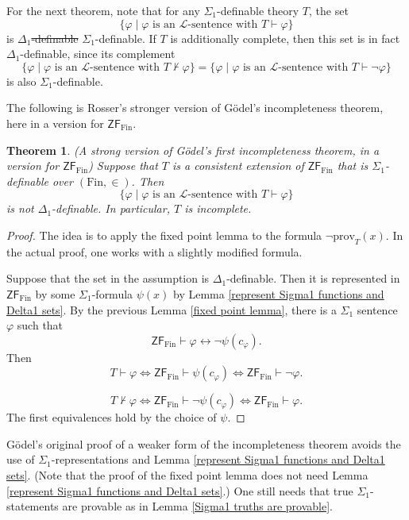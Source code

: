 \documentclass[a4paper, 11pt]{amsart}
\newtheorem{theorem}{Theorem}[subsection]
\theoremstyle{remark}
\newcommand{\axiomft}[1]{\mathsf{#1}}
\newcommand{\ZF}{\axiomft{ZF}}
\newcommand{\Fin}{\mathrm{Fin}}
\newcommand{\prov}{\mathrm{prov}}
\newcommand{\cL}{\mathcal L}
\begin{document}
For the next theorem, note that for any $\Sigma_1$-definable theory $T$, the set 
$$ \{ \varphi \mid  \varphi \text{ is an $\cL$-sentence with } T\vdash \varphi \} $$ 
is \sout{$\Delta_1$-definable} {\color{blue}$\Sigma_1$-definable}. 
{\color{blue} If $T$ is additionally complete, then this set is in fact $\Delta_1$-definable, since its complement 
$$ \{ \varphi \mid  \varphi \text{ is an $\cL$-sentence with } T\not\vdash \varphi \} =  \{ \varphi \mid  \varphi \text{ is an $\cL$-sentence with } T\vdash \neg\varphi \} $$ 
is also $\Sigma_1$-definable}. 


The following is Rosser's stronger version of G\"odel's incompleteness theorem, here in a version for $\ZF_\Fin$. 

\begin{theorem} 
\label{Goedel Rosser incompleteness theorem} 
(A strong version of G\"odel's first incompleteness theorem, in a version for $\ZF_\Fin$) 
Suppose that $T$ is a consistent extension of $\ZF_\Fin$ that is $\Sigma_1$-definable over $(\Fin,\in)$. 
Then 
$$ \{ \varphi \mid  \varphi \text{ is an $\cL$-sentence with } T\vdash \varphi \} $$ 
is not $\Delta_1$-definable. 
In particular, $T$ is incomplete. 
\end{theorem} 
\begin{proof} 
The idea is to apply the fixed point lemma to the formula $\neg\prov_T(x)$. 
In the actual proof, one works with a slightly modified formula. 

Suppose that the set in the assumption is $\Delta_1$-definable. 
Then it is represented in $\ZF_\Fin$ by some $\Sigma_1$-formula $\psi(x)$ by Lemma \ref{represent Sigma1 functions and Delta1 sets}. 
By the previous Lemma \ref{fixed point lemma}, there is a {\color{blue}\sout{$\Sigma_1$}} sentence $\varphi$ such that 
$$ \ZF_\Fin \vdash  \varphi\longleftrightarrow   \neg \psi(c_\varphi). $$ 
Then 
$$ T\vdash \varphi   \Longleftrightarrow   \ZF_\Fin  \vdash \psi(c_\varphi)   \Longleftrightarrow  \ZF_\Fin \vdash \neg \varphi. $$ 

$$ T\not\vdash \varphi   \Longleftrightarrow   \ZF_\Fin  \vdash \neg \psi(c_\varphi)   \Longleftrightarrow  \ZF_\Fin \vdash \varphi. $$ 
The first equivalences hold by the choice of $\psi$. 
\end{proof} 


G\"odel's original proof of a weaker form of the incompleteness theorem avoids the use of $\Sigma_1$-representations and Lemma \ref{represent Sigma1 functions and Delta1 sets}. 
(Note that the proof of the fixed point lemma does not need Lemma \ref{represent Sigma1 functions and Delta1 sets}.) 
One still needs that true $\Sigma_1$-statements are provable as in Lemma \ref{Sigma1 truths are provable}. 
\end{document}
